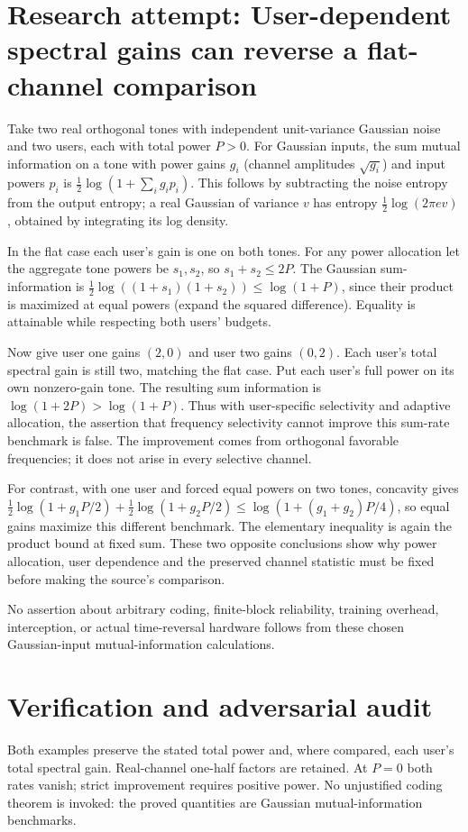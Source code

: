 \documentclass[11pt]{article}
\begin{document}
\section{Research attempt: User-dependent spectral gains can reverse a flat-channel comparison}
Take two real orthogonal tones with independent unit-variance Gaussian noise
and two users, each with total power $P>0$. For Gaussian inputs, the sum mutual
information on a tone with power gains $g_i$ (channel amplitudes
$\sqrt{g_i}$) and input powers $p_i$ is
$\tfrac12\log(1+\sum_i g_ip_i)$. This follows by subtracting the noise entropy
from the output entropy; a real Gaussian of variance $v$ has entropy
$\tfrac12\log(2\pi e v)$, obtained by integrating its log density.

In the flat case each user's gain is one on both tones. For any power allocation
let the aggregate tone powers be $s_1,s_2$, so $s_1+s_2\le2P$.
The Gaussian sum-information is
$\tfrac12\log((1+s_1)(1+s_2))\le\log(1+P)$,
since their product is maximized at equal powers (expand the squared difference).
Equality is attainable while respecting both users' budgets.

Now give user one gains $(2,0)$ and user two gains $(0,2)$.
Each user's total spectral gain is still two, matching the flat case.
Put each user's full power on its own nonzero-gain tone. The resulting sum
information is $\log(1+2P)>\log(1+P)$. Thus with user-specific selectivity
and adaptive allocation, the assertion that frequency selectivity cannot improve
this sum-rate benchmark is false. The improvement comes from orthogonal
favorable frequencies; it does not arise in every selective channel.

For contrast, with one user and forced equal powers on two tones, concavity
gives
$\frac12\log(1+g_1P/2)+\frac12\log(1+g_2P/2)
\le\log(1+(g_1+g_2)P/4)$, so equal gains maximize this different benchmark.
The elementary inequality is again the product bound at fixed sum. These two
opposite conclusions show why power allocation, user dependence and the
preserved channel statistic must be fixed before making the source's comparison.

No assertion about arbitrary coding, finite-block reliability, training overhead,
interception, or actual time-reversal hardware follows from these chosen
Gaussian-input mutual-information calculations.
\section{Verification and adversarial audit}
Both examples preserve the stated total power and, where compared, each
user's total spectral gain. Real-channel one-half factors are retained. At
$P=0$ both rates vanish; strict improvement requires positive power. No
unjustified coding theorem is invoked: the proved quantities are Gaussian
mutual-information benchmarks.
\end{document}
